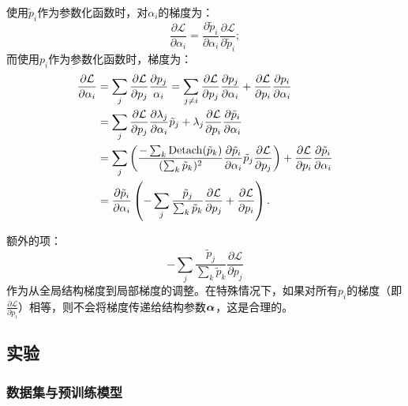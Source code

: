 使用$\tilde{p}_i$作为参数化函数时，对$\alpha_i$的梯度为：
\begin{equation}
\frac{\partial {\mathcal{L}}}{\partial \alpha_i} = \frac{\partial{\tilde{p}}_i}{\partial{\alpha_i}}\frac{\partial{{\mathcal{L}}}}{\partial{\tilde{p}_i}};
\end{equation}
而使用$p_i$作为参数化函数时，梯度为：
\begin{align}
\frac{\partial {\mathcal{L}}}{\partial \alpha_i} & = \sum_j \frac{\partial {\mathcal{L}}}{\partial{p}_j} \frac{\partial{p_j}}{\alpha_i} = \sum_{j\neq i} \frac{\partial {\mathcal{L}}}{\partial{p}_j} \frac{\partial{p_j}}{\partial\alpha_i} + \frac{\partial {\mathcal{L}}}{\partial{p}_i} \frac{\partial{p_i}}{\partial\alpha_i} \\ 
& = \sum_{j} \frac{\partial{{\mathcal{L}}}}{\partial p_j}\frac{\partial\lambda_j}{\partial \alpha_i} \tilde{p}_j + \lambda_j \frac{\partial{{\mathcal{L}}}}{\partial p_i}\frac{\partial\tilde{p}_i}{\partial{\alpha_i}} \\
& = \sum_{j}\left(\frac{-\sum_k\operatorname{Detach}(\Tilde{p}_k)}{(\sum_k \Tilde{p}_k)^2}\frac{\partial{\tilde{p}_i}}{\partial{\alpha_i}}\Tilde{p}_j\frac{\partial{{\mathcal{L}}}}{\partial{p}_j}\right) + \frac{\partial{{\mathcal{L}}}}{\partial p_i}\frac{\partial\tilde{p}_i}{\partial{\alpha_i}}  \\
& = \frac{\partial\tilde{p}_i}{\partial{\alpha_i}} \left(-\sum_j\frac{\tilde{p}_j}{\sum_k{\tilde{p}_k}}\frac{\partial{{\mathcal{L}}}}{\partial{p_j}} + \frac{\partial{{\mathcal{L}}}}{\partial{p_i}}\right).
\end{align}

额外的项：
\begin{equation}
    -\sum_j\frac{\tilde{p}_j}{\sum_k{\tilde{p}_k}}\frac{\partial{{\mathcal{L}}}}{\partial{{p}_j}} 
\end{equation}
作为从全局结构梯度到局部梯度的调整。在特殊情况下，如果对所有$p_i$的梯度（即$\frac{\partial{{\mathcal{L}}}}{\partial{{p}_i}}$）相等，则不会将梯度传递给结构参数$\boldsymbol{\alpha}$，这是合理的。




\subsection{实验}

\subsubsection{数据集与预训练模型}

